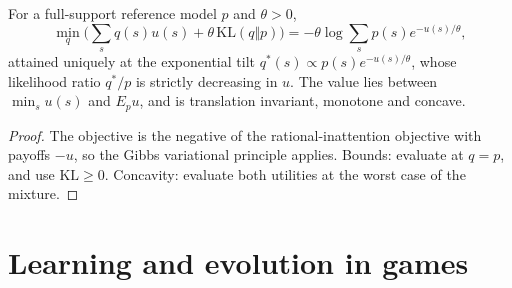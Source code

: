 \begin{theorem}
\label{thm:beh-multiplier}
\leanok
{}
For a full-support reference model $p$ and $\theta>0$,
\[\min_q\Big(\sum_s q(s)u(s)+\theta\,\mathrm{KL}(q\Vert p)\Big)=-\theta\log\sum_s p(s)e^{-u(s)/\theta},\]
attained uniquely at the exponential tilt $q^*(s)\propto p(s)e^{-u(s)/\theta}$, whose likelihood ratio $q^*/p$ is strictly
decreasing in $u$. The value lies between $\min_s u(s)$ and $E_pu$, and is translation invariant, monotone and concave.
\end{theorem}
\begin{proof}
\leanok
The objective is the negative of the rational-inattention objective with payoffs $-u$, so the Gibbs variational
principle applies. Bounds: evaluate at $q=p$, and use $\mathrm{KL}\ge0$. Concavity: evaluate both utilities at the
worst case of the mixture.
\end{proof}

\section{Learning and evolution in games}

